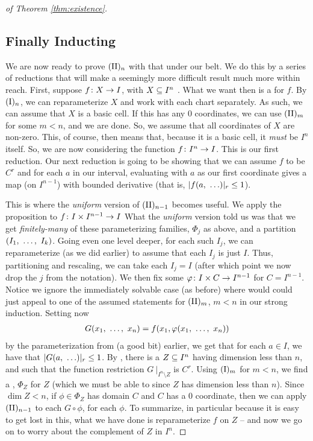 \begin{proof}[of Theorem \ref{thm:existence}]
    \subsection{Finally Inducting}

    We are now ready to prove $\IIn[n]$ with that under our belt. We do this by a series of reductions that will make a seemingly more difficult result much more within reach. First, suppose $\funcdom{f}{X}{I}$, with $\CIn[X]{n}$ . What we want then is a \cellrparam for $f$. By $\In[n]$, we can reparameterize $X$ and work with each chart separately. As such, we can assume that $X$ is a basic cell. If this has any 0 coordinates, we can use $\IIn[m]$ for some $m < n$, and we are done. So, we assume that all coordinates of $X$ are non-zero. This, of course, then means that, because it is a basic cell, it \emph{must} be $I^n$ itself. So, we are now considering the function $\funcdom{f}{I^n}{I}$. This is our first reduction. Our next reduction is going to be showing that we can assume $f$ to be $C^r$ and for each $a$ in our interval, evaluating with $a$ as our first coordinate gives a map (on $I^{n-1}$) with bounded derivative  (that is, $\rnorm{f(a, \ \hdots)} \leq 1$).

    This is where the \emph{uniform} version of $\IIn[n-1]$ becomes useful. We apply the proposition to $\funcdom{f}{I \times I^{n-1}}{I}$ What the \emph{uniform} version told us was that we get \emph{finitely-many} of these parameterizing families, $\Phi_j$ as above, and a partition $(\vonevm{I}{k})$. Going even one level deeper, for each such $I_j$, we can reparameterize (as we did earlier) to assume that each $I_j$ is just $I$. Thus, partitioning and rescaling, we can take each $I_j = I$ (after which point we now drop the $j$ from the notation). We then fix some $\funcdom{\phi}{I \times C}{I^{n-1}}$ for $C = I^{n - 1}$. Notice we ignore the immediately solvable case (as before) where would could just appeal to one of the assumed statements for $\IIn[m]$, $m < n$ in our strong induction. Setting now
     \begin{align*}
       G(\vonevm{x}{n}) = f(x_1, \phi(\vonevm{x}{n}))
     \end{align*}
     by the parameterization from (a good bit) earlier, we get that for each $a \in I$, we have that $\rnorm{G(a, \ \hdots)} \leq 1$. By \scd, there is a  $\CIn[Z]{n}$ having dimension less than $n$, and such that the function restriction $G \ \vert_{I^n \setminus Z}$ is $C^r$. Using $\In[m]$ for $m < n$, we find a \cellrparam, $\Phi_Z$ for $Z$ (which we must be able to since $Z$ has dimension less than $n$). Since $\dim{Z} < n$, if $\phi \in \Phi_Z$ has domain $C$ and $C$ has a 0 coordinate, then we can apply $\IIn[n-1]$ to each $G \circ \phi$, for each $\phi$. To summarize, in particular because it is easy to get lost in this, what we have done is reparameterize $f$ on $Z$ -- and now we go on to worry about the complement of $Z$ in $I^n$.


\end{proof}
